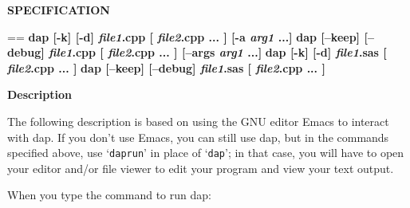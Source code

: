 \documentclass{book}
\makeatletter
\newcommand\Texinfocommandstyletextvar[1]{{\normalfont{}\textsl{#1}}}%
\newenvironment{Texinfopreformatted}{%
  \par\GNUTobeylines\obeyspaces\frenchspacing\parskip=\z@\parindent=\z@}{}
{\catcode`\^^M=13 \gdef\GNUTobeylines{\catcode`\^^M=13 \def^^M{\null\par}}}
\newenvironment{Texinfoindented}{\begin{list}{}{}\item\relax}{\end{list}}
\renewcommand{\_}{\Texinfounderscore\discretionary{}{}{}}
\makeatother
\begin{document}
\noindent{}\textbf{SPECIFICATION}

\begin{Texinfoindented}
\begin{Texinfopreformatted}%
\textbf{dap [-k] [-d] \Texinfocommandstyletextvar{file1}.cpp [ \Texinfocommandstyletextvar{file2}.cpp ... ] [-a \Texinfocommandstyletextvar{arg1} ...]}
\textbf{dap [--keep] [--debug] \Texinfocommandstyletextvar{file1}.cpp [ \Texinfocommandstyletextvar{file2}.cpp ... ] [--args \Texinfocommandstyletextvar{arg1} ...]}
\textbf{dap [-k] [-d] \Texinfocommandstyletextvar{file1}.sas [ \Texinfocommandstyletextvar{file2}.cpp ... ]}
\textbf{dap [--keep] [--debug] \Texinfocommandstyletextvar{file1}.sas [ \Texinfocommandstyletextvar{file2}.cpp ... ]}
\end{Texinfopreformatted}
\end{Texinfoindented}

\noindent{}\textbf{Description}

The following description is based on using the GNU editor Emacs to
interact with dap.
If you don't use Emacs, you can still use dap, but in the commands
specified above, use `\texttt{daprun}' in place of `\texttt{dap}'; in that case,
you will have to open your editor and/or file viewer to edit your program
and view your text output.

When you type the command to run dap:
\end{document}
